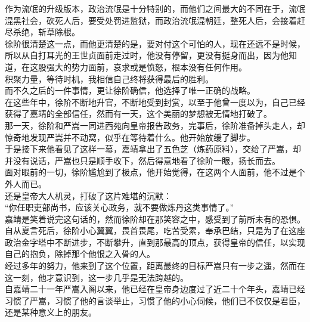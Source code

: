 \begin{multicols}{\theparacolNo}
作为流氓的升级版本，政治流氓是十分特别的，而他们之间最大的不同在于，流氓混黑社会，砍死人后，要受处罚进监狱，而政治流氓混朝廷，整死人后，会接着赶尽杀绝，斩草除根。\\

徐阶很清楚这一点，而他更清楚的是，要对付这个可怕的人，现在还远不是时候，所以从自打耳光的王世贞面前走过时，他没有停留，更没有挺身而出，因为他知道，在这股强大的势力面前，哀求或是愤怒，根本没有任何作用。\\

积聚力量，等待时机，我相信自己终将获得最后的胜利。\\

而不久之后的一件事情，更让徐阶确信，他选择了唯一正确的战略。\\

在这些年中，徐阶不断地升官，不断地受到封赏，以至于他曾一度以为，自己已经获得了嘉靖的全部信任，然而有一天，这个美丽的梦想被无情地打破了。\\

那一天，徐阶和严嵩一同进西苑向皇帝报告政务，完事后，徐阶准备掉头走人，却惊奇地发现严嵩并不动窝，似乎在等待着什么。他开始放缓了脚步。\\

于是接下来他看见了这样一幕，嘉靖拿出了五色芝（炼药原料），交给了严嵩，却并没有说话，严嵩也只是顺手收下，然后得意地看了徐阶一眼，扬长而去。\\

面对眼前的一切，徐阶尴尬到了极点，他开始觉得，在这两个人面前，他不过是个外人而已。\\

还是皇帝大人机灵，打破了这片难堪的沉默：\\

“你任职吏部尚书，应该关心政务，就不要做炼丹这类事情了。”\\

嘉靖是笑着说完这句话的，然而徐阶却在那笑容之中，感受到了前所未有的恐惧。\\

自从夏言死后，徐阶小心翼翼，畏首畏尾，吃苦受累，奉承巴结，只是为了在这座政治金字塔中不断进步，不断攀升，直到那最高的顶点，获得皇帝的信任，以实现自己的抱负，除掉那个他恨之入骨的人。\\

经过多年的努力，他来到了这个位置，距离最终的目标严嵩只有一步之遥，然而在这一刻，他才意识到，这一步几乎是无法跨越的。\\

自嘉靖二十一年严嵩入阁以来，他已经在皇帝身边度过了近二十个年头，嘉靖已经习惯了严嵩，习惯了他的言谈举止，习惯了他的小心伺候，他们已不仅仅是君臣，还是某种意义上的朋友。\\


\end{multicols}
